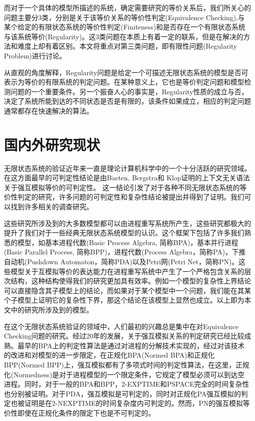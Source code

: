 而对于一个具体的模型所描述的系统，确定需要研究的等价关系后，我们所关心的问题主要分3类，分别是关于该等价关系的等价性判定(Equivalence Checking),与某个给定的有限状态系统的等价性判定(Finiteness)和是否存在一个有限状态系统与该系统等价(Regularity)。这3类问题在本质上有着一定的联系，但是在解决的方法和难度上却有着区别。本文将重点对第三类问题，即有限性问题(Regularity Problem)进行讨论。

从直观的角度解释，Regularity问题是给定一个可描述无限状态系统的模型是否可表示为等价的有限系统的判定问题。在某种意义上，它也是等价判定问题和模型检测问题的一个重要条件。另一个振奋人心的事实是，Regularity性质的成立与否，决定了系统所能到达的不同状态是否是有限的，该条件如果成立，相应的判定问题通常都存在快速解决的算法。

\section{国内外研究现状}
\label{sec:state-of-the-art}

无限状态系统的验证近年来一直是理论计算机科学中的一个十分活跃的研究领域。在这方面最早的可判定性结论是由Baeten, Bergstra和 Klop证明的上下文无关语法关于强互模拟等价的可判定性\cite{Baeten1993}。 这一结论引发了对于各种不同无限状态系统的等价性判定的研究，许多问题的可判定性和复杂性结论被提出并得到了证明。我们可以找到许多相关的调查研究\cite{Burkart2001, Kucera2006, Moller2004, Srba2002}。

这些研究所涉及到的大多数模型都可以由进程重写系统所产生\cite{Mayr2000}，这些研究都极大的提升了我们对于一些经典无限状态系统模型的认识。这个框架下包括了许多我们熟悉的模型，如基本进程代数(Basic Process Algebra, 简称BPA)\cite{Bergstra1985}，基本并行进程(Basic Parallel Process, 简称BPP)\cite{Christensen1993}，进程代数(Process Algebra，简称PA)\cite{Baeten1990}，下推自动机(Pushdown Automaton，简称PDA)\cite{Hopcroft1979}以及Petri网(Petri Net，简称PN)\cite{Peterson1977}。这些模型关于互模拟等价的表达能力在进程重写系统中产生了一个严格包含关系的层次结构，这种结构使得我们的研究更加具有效率。例如一个模型的复杂性上界结论可以直接隐含其子模型上的结论，而如果对于某个模型中一个问题，我们能在其某个子模型上证明它的复杂性下界，那这个结论在该模型上显然也成立。以上即为本文中的研究所涉及到的模型。

在这个无限状态系统验证的领域中，人们最初的兴趣总是集中在对Equivalence Checking问题的研究。经过20年的发展，关于强互模拟关系的判定研究已经比较成熟。最早的BPA上的判定性算法是通过对进程的分解技术实现的\cite{Baeten1993,Christensen1992}，经过对该技术的改进和对模型的进一步限定，在正规化BPA(Normed BPA)和正规化BPP(Normed BPP)上，强互模拟都有了多项式时间的判定性算法\cite{Hirshfeld,Hirshfelda}，在这里，正规化(Normedness)是对于进程模型的一个限定条件，它规定了模型必须可以到达空进程。同时，对于一般的BPA和BPP，2-EXPTIME和PSPACE完全的时间复杂性也分别被证明\cite{Burkart1995,Jancar2012,Jancar2003}。对于PDA，强互模拟是可判定的\cite{Senizergues1998,Stirling1998}，同时对正规化PA强互模拟的判定也被证明是在2-NEXPTIME的时间复杂度内可判定的\cite{Hirshfeldb}。然而，PN的强互模拟等价性即使在正规化条件的限定下也是不可判定的\cite{Jancar1995}。 

